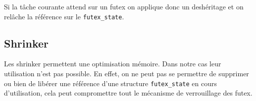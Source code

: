 Si la tâche courante attend sur un futex on applique donc un deshéritage et on relâche la référence sur le
\verb|futex_state|. 

\subsection{Shrinker}

Les shrinker permettent une optimisation mémoire.
Dans notre cas leur utilisation n'est pas possible. En effet, on ne peut pas se permettre 
de supprimer ou bien de libérer une référence d'une structure \verb|futex_state| en cours 
d'utilisation, cela peut compromettre tout le mécanisme de verrouillage des futex.